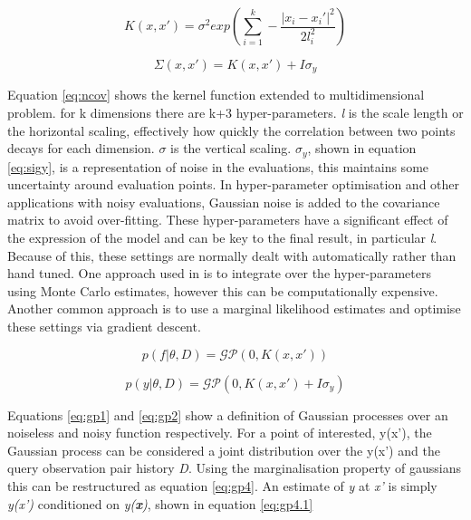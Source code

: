 			\begin{equation} \label{eq:ncov} K(x,x') = \sigma^2 exp\left(\sum_{i=1}^k-\frac{\mathopen|x_i - x_i'\mathclose|^2}{2l_i^2}\right)\end{equation}

			\begin{equation}\label{eq:sigy} \Sigma(x,x') = K(x,x') + I \sigma_y \end{equation}


			 Equation \ref{eq:ncov} shows the kernel function extended to multidimensional problem. for k dimensions there are k+3 hyper-parameters. \textit{l} is the scale length or the horizontal scaling, effectively how quickly the correlation between two points decays for each dimension. \(\sigma\) is the vertical scaling. \(\sigma_y\), shown in equation \ref{eq:sigy}, is a representation of noise in the evaluations, this maintains some uncertainty around evaluation points.  In hyper-parameter optimisation and other applications with noisy evaluations, Gaussian noise is added to the covariance matrix to avoid over-fitting. These hyper-parameters have a significant effect of the expression of the model and can be key to the final result, in particular \textit{l}. Because of this, these settings are normally dealt with automatically rather than hand tuned. One approach used in \cite{17} is to integrate over the hyper-parameters using Monte Carlo estimates, however this can be computationally expensive. Another common approach is to use a marginal likelihood estimates and optimise these settings via gradient descent.

 


			\begin{equation}\label{eq:gp1} p(f|\theta,D) = \mathcal{GP}(0,K(x,x'))\end{equation}

			\begin{equation}\label{eq:gp2} p(y|\theta,D) = \mathcal{GP}(0,K(x,x') + I\sigma_y)\end{equation}


 			Equations \ref{eq:gp1} and \ref{eq:gp2} show a definition of Gaussian processes over an noiseless and noisy function respectively. For a point of interested, y(x'), the Gaussian process can be considered a joint distribution over the y(x') and the query observation pair history \textit{D}. Using the marginalisation property of gaussians this can be restructured as equation \ref{eq:gp4}. An estimate of \textit{y} at \textit{x'} is simply \textit{y(x')} conditioned on \textit{y(\textbf{x})}, shown in equation \ref{eq:gp4.1}

